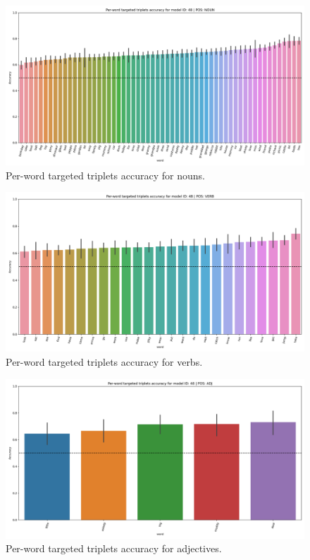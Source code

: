 \begin{figure}
  \centering
  \includegraphics[width=\textwidth]{results/targeted_triplets/results_NOUN_word.png}
  \caption{Per-word targeted triplets accuracy for nouns.}
  \label{fig:accuracy_targeted_triplets_nouns}
\end{figure}

\begin{figure}
  \centering
  \includegraphics[width=\textwidth]{results/targeted_triplets/results_VERB_word.png}
  \caption{Per-word targeted triplets accuracy for verbs.}
  \label{fig:accuracy_targeted_triplets_verbs}
\end{figure}

\begin{figure}
  \centering
  \includegraphics[width=\textwidth]{results/targeted_triplets/results_ADJ_word.png}
  \caption{Per-word targeted triplets accuracy for adjectives.}
  \label{fig:accuracy_targeted_triplets_adjectives}
\end{figure}

